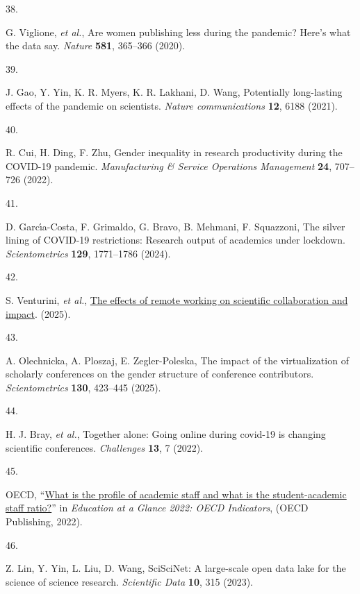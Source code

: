 \documentclass[
  11pt,
]{article}
\newlength{\cslhangindent}
\newlength{\csllabelwidth}
\newenvironment{CSLReferences}[2] %
 {\begin{list}{}{%
  \setlength{\itemindent}{0pt}
  \setlength{\leftmargin}{0pt}
  \setlength{\parsep}{0pt}
  \ifodd #1
   \setlength{\leftmargin}{\cslhangindent}
   \setlength{\itemindent}{-1\cslhangindent}
  \fi
  \setlength{\itemsep}{#2\baselineskip}}}
 {\end{list}}
\newcommand{\CSLLeftMargin}[1]{\parbox[t]{\csllabelwidth}{\strut#1\strut}}
\newcommand{\CSLRightInline}[1]{\parbox[t]{\linewidth - \csllabelwidth}{\strut#1\strut}}
\begin{document}
\begin{CSLReferences}{0}{1}
\CSLLeftMargin{38. }%
\CSLRightInline{G. Viglione, \emph{et al.}, Are women publishing less during the pandemic? Here's what the data say. \emph{Nature} \textbf{581}, 365--366 (2020).}

\CSLLeftMargin{39. }%
\CSLRightInline{J. Gao, Y. Yin, K. R. Myers, K. R. Lakhani, D. Wang, Potentially long-lasting effects of the pandemic on scientists. \emph{Nature communications} \textbf{12}, 6188 (2021).}

\CSLLeftMargin{40. }%
\CSLRightInline{R. Cui, H. Ding, F. Zhu, Gender inequality in research productivity during the COVID-19 pandemic. \emph{Manufacturing \& Service Operations Management} \textbf{24}, 707--726 (2022).}

\CSLLeftMargin{41. }%
\CSLRightInline{D. Garcı́a-Costa, F. Grimaldo, G. Bravo, B. Mehmani, F. Squazzoni, The silver lining of COVID-19 restrictions: Research output of academics under lockdown. \emph{Scientometrics} \textbf{129}, 1771--1786 (2024).}

\CSLLeftMargin{42. }%
\CSLRightInline{S. Venturini, \emph{et al.}, \href{https://arxiv.org/abs/2511.18481}{The effects of remote working on scientific collaboration and impact}. (2025).}

\CSLLeftMargin{43. }%
\CSLRightInline{A. Olechnicka, A. Ploszaj, E. Zegler-Poleska, The impact of the virtualization of scholarly conferences on the gender structure of conference contributors. \emph{Scientometrics} \textbf{130}, 423--445 (2025).}

\CSLLeftMargin{44. }%
\CSLRightInline{H. J. Bray, \emph{et al.}, Together alone: Going online during covid-19 is changing scientific conferences. \emph{Challenges} \textbf{13}, 7 (2022).}

\CSLLeftMargin{45. }%
\CSLRightInline{OECD, {``\href{https://doi.org/10.1787/bb6ee273-en}{What is the profile of academic staff and what is the student-academic staff ratio?}''} in \emph{Education at a Glance 2022: OECD Indicators}, (OECD Publishing, 2022).}

\CSLLeftMargin{46. }%
\CSLRightInline{Z. Lin, Y. Yin, L. Liu, D. Wang, SciSciNet: A large-scale open data lake for the science of science research. \emph{Scientific Data} \textbf{10}, 315 (2023).}


\end{CSLReferences}
\end{document}
